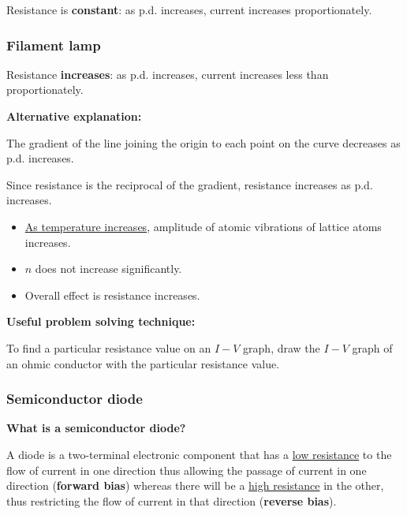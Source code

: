 Resistance is \textbf{constant}: as p.d. increases, current increases proportionately.

\subsubsection{Filament lamp}

\begin{figure}[H]
\centering
{}
\end{figure}

Resistance \textbf{increases}: as p.d. increases, current increases less than proportionately.

\begin{tcolorbox}
\textbf{Alternative explanation:}

The gradient of the line joining the origin to each point on the curve decreases as p.d. increases.

Since resistance is the reciprocal of the gradient, resistance increases as p.d. increases.
\end{tcolorbox}

\begin{itemize}
\item \underline{As temperature increases}, amplitude of atomic vibrations of lattice atoms increases.
\item $n$ does not increase significantly. 
\item Overall effect is resistance increases.
\end{itemize}

\textbf{Useful problem solving technique:}

To find a particular resistance value on an $I-V$ graph, draw the $I-V$ graph of an ohmic conductor with the particular resistance value.

\subsubsection{Semiconductor diode}

\begin{tcolorbox}
\textbf{What is a semiconductor diode?}

A diode is a two-terminal electronic component that has a \underline{low resistance} to the flow of current in one direction thus allowing the passage of current in one direction (\textbf{forward bias}) whereas there will be a \underline{high resistance} in the other, thus restricting the flow of current in that direction (\textbf{reverse bias}).
\end{tcolorbox}

